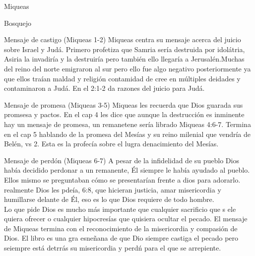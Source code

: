 \documentclass[12pt]{article}
\begin{document}
\begin{section}{Miqueas}
\begin{enumerate}
	\end{enumerate}
	\begin{subsection}{Bosquejo}
		\begin{subsubsection}{Mensaje de castigo (Miqueas 1-2)}
			Miqueas centra su mensaje acerca del juicio sobre Israel y Judá. Primero profetiza que Samria sería destruida por idolátria, Asiria la invadiría y la destruiría pero también ello llegaría a Jerusalén.Muchas del reino del norte emigraron al sur pero ello fue algo negativo posteriormente ya que ellos traían maldad y religión contamidad de cree en múltiples deidades y contaminaron a Judá. En el 2:1-2 da razones del juicio para Judá. 
		\end{subsubsection}
		\begin{subsubsection}{Mensaje de promesa (Miqueas 3-5)}
			Miqueas les recuerda que Dios guarada sus promsesa y pactos. En el cap 4 les dice que aunque la destrucción es inminente hay un mensaje de promesa, un remanetene sería librado Miqueas 4:6-7. Termina en el cap 5 hablando de la promesa del Mesías y su reino milenial que vendría de Belén, vs 2. Esta es la profecía sobre el lugra denacimiento del Mesías.
		\end{subsubsection}
		\begin{subsubsection}{Mensaje de perdón (Miqueas 6-7)}
			A pesar de la infidelidad de su pueblo Dios había decidido perdonar a un remanente, Él siempre le había ayudado al pueblo. Ellos mismo se preguntaban cómo se presentarían frente a dios para adorarlo. realmente Dios les pdeía, 6:8, que hicieran justicia, amar misericordia y humillarse delante de Él, eso es lo que Dios requiere de todo hombre.\\
			Lo que pide Dios es mucho más importante que cualquier sacrificio que s ele quiera ofrecer o cualquier hipocresías que quisiera ocultar el pecado. El mensaje de Miqueas termina con el reconocimiento de la misericordia y compasión de Dios. El libro es una gra esneñana de que Dio siempre castiga el pecado pero seiempre está detrrás su misericordia y perdń para el que se arrepiente.
		\end{subsubsection}
	\end{subsection}
\end{section}
\end{document}
